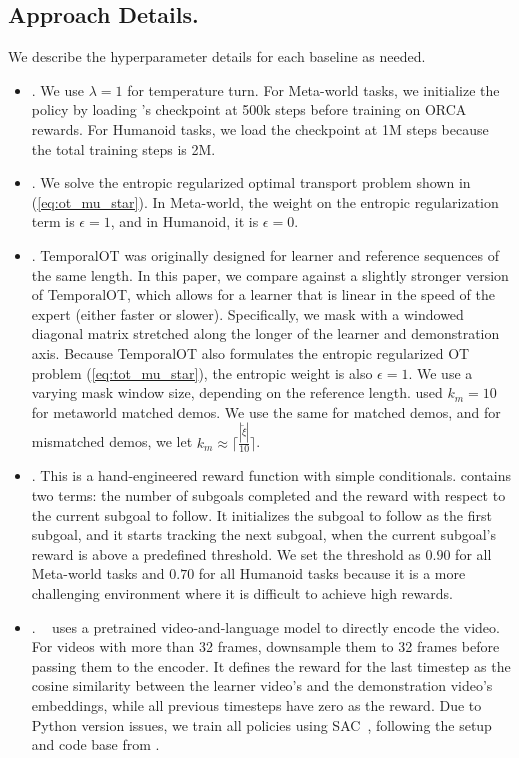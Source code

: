 \subsection{Approach Details.\label{app:baselines}}
We describe the hyperparameter details for each baseline as needed. 
\begin{itemize}
    \item \orca{}. We use $\lambda=1$ for temperature turn. For Meta-world tasks, we initialize the policy by loading \tot{}'s checkpoint at 500k steps before training on ORCA rewards. For Humanoid tasks, we load the checkpoint at 1M steps because the total training steps is 2M.
    \item \ot{}. We solve the entropic regularized optimal transport problem shown in (\ref{eq:ot_mu_star}). In Meta-world, the weight on the entropic regularization term is $\epsilon=1$, and in Humanoid, it is $\epsilon=0$.
    \item \tot{}. TemporalOT \cite{fu2024robot} was originally designed for learner and reference sequences of the same length. In this paper, we compare against a slightly stronger version of TemporalOT, which allows for a learner that is linear in the speed of the expert (either faster or slower). Specifically, we mask with a windowed diagonal matrix stretched along the longer of the learner and demonstration axis. Because TemporalOT also formulates the entropic regularized OT problem (\ref{eq:tot_mu_star}), the entropic weight is also $\epsilon=1$. We use a varying mask window size, depending on the reference length. \citet{fu2024robot} used $k_m=10$ for metaworld matched demos. We use the same for matched demos, and for mismatched demos, we let $k_m \approx \lceil\frac{|\tilde{\xi}|}{10}\rceil$.
    \item \threshold{}. This is a hand-engineered reward function with simple conditionals. \threshold{} contains two terms: the number of subgoals completed and the reward with respect to the current subgoal to follow. It initializes the subgoal to follow as the first subgoal, and it starts tracking the next subgoal, when the current subgoal's reward is above a predefined threshold. We set the threshold as $0.90$ for all Meta-world tasks and $0.70$ for all Humanoid tasks because it is a more challenging environment where it is difficult to achieve high rewards.
    \item \roboclip{}. \roboclip{}~\citep{sontakke2024roboclip} uses a pretrained video-and-language model \citep{xie2018rethinking} to directly encode the video. For videos with more than 32 frames, \roboclip{} downsample them to 32 frames before passing them to the encoder. 
    It defines the reward for the last timestep as the cosine similarity between the learner video's and the demonstration video's embeddings, while all previous timesteps have zero as the reward. Due to Python version issues, we train all \roboclip{} policies using SAC~\cite{haarnoja2018softactorcriticoffpolicymaximum}, following the setup and code base from \citet{sontakke2024roboclip}.
\end{itemize}

